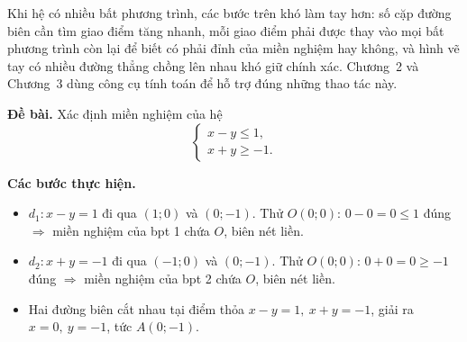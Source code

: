 \documentclass[12pt,a4paper]{report}
\begin{document}
\begin{notebox}
Khi hệ có nhiều bất phương trình, các bước trên khó làm tay hơn: số cặp đường biên cần tìm giao điểm tăng nhanh, mỗi giao điểm phải được thay vào mọi bất phương trình còn lại để biết có phải đỉnh của miền nghiệm hay không, và hình vẽ tay có nhiều đường thẳng chồng lên nhau khó giữ chính xác. Chương~2 và Chương~3 dùng công cụ tính toán để hỗ trợ đúng những thao tác này.
\end{notebox}

\begin{examplebox}
\textbf{Đề bài.} Xác định miền nghiệm của hệ
\[
\begin{cases}
x-y\le 1,\\
x+y\ge -1.
\end{cases}
\]

\textbf{Các bước thực hiện.}
\begin{itemize}
\item $d_1: x-y=1$ đi qua $(1;0)$ và $(0;-1)$. Thử $O(0;0)$: $0-0=0\le 1$ đúng $\Rightarrow$ miền nghiệm của bpt 1 chứa $O$, biên nét liền.
\item $d_2: x+y=-1$ đi qua $(-1;0)$ và $(0;-1)$. Thử $O(0;0)$: $0+0=0\ge -1$ đúng $\Rightarrow$ miền nghiệm của bpt 2 chứa $O$, biên nét liền.
\item Hai đường biên cắt nhau tại điểm thỏa $x-y=1,\ x+y=-1$, giải ra $x=0,\ y=-1$, tức $A(0;-1)$.
\end{itemize}

\begin{center}
\end{center}
\end{examplebox}
\end{document}
